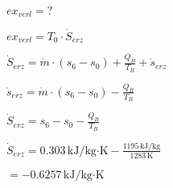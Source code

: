 \( ex_{verl} = ? \)  

\( ex_{verl} = T_0 \cdot \dot{S}_{erz} \)  

\( \dot{S}_{erz} = \dot{m} \cdot (s_6 - s_0) + \frac{Q_B}{T_B} + \dot{s}_{erz} \)  

\( \dot{s}_{erz} = \dot{m} \cdot (s_6 - s_0) - \frac{Q_B}{T_B} \)  

\( \dot{S}_{erz} = s_6 - s_0 - \frac{Q_B}{T_B} \)  

\( \dot{S}_{erz} = 0.303 \, \text{kJ/kg·K} - \frac{1195 \, \text{kJ/kg}}{1283 \, \text{K}} \)  

\( = -0.6257 \, \text{kJ/kg·K} \)